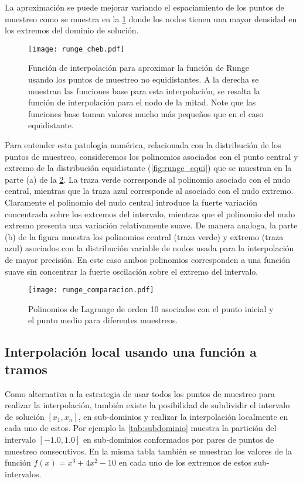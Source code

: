 La aproximación se puede mejorar variando el espaciamiento de los puntos de muestreo como se muestra en la \cref{fig:runge_cheb} donde los nodos tienen una mayor densidad en los extremos del dominio de solución.

\begin{figure}[H]
  \centering
  \texttt{[image: runge\_cheb.pdf]}
  \caption{Función de interpolación para aproximar la función de Runge usando los puntos de muestreo no equidistantes. A la derecha se muestran las funciones base para esta interpolación, se resalta la función de interpolación para el nodo de la mitad. Note que las funciones base toman valores mucho más pequeños que en el caso equidistante.}
\label{fig:runge_cheb}
\end{figure}

Para entender esta patología numérica, relacionada con la distribución de los puntos de muestreo, consideremos los polinomios asociados con el punto central y extremo de la distribución equidistante (\cref{fig:runge_equi}) que se muestran en la parte (a) de la \cref{fig:runge_comparacion}. La traza verde corresponde al polinomio asociado con el nudo central, mientras que la traza azul corresponde al asociado con el nudo extremo. Claramente el polinomio del nudo central introduce la fuerte variación concentrada sobre los extremos del intervalo, mientras que el polinomio del nudo extremo presenta una variación relativamente suave. De manera analoga, la parte (b) de la figura muestra los polinomios central (traza verde) y extremo (traza azul) asociados con la distribución variable de nodos usada para la interpolación de mayor precisión. En este caso ambos polinomios corresponden a una función suave sin concentrar la fuerte oscilación sobre el extremo del intervalo.

\begin{figure}[H]
  \centering
  \texttt{[image: runge\_comparacion.pdf]}
  \caption{Polinomios de Lagrange de orden 10 asociados con el punto inicial y el punto medio para diferentes muestreos.}
  \label{fig:runge_comparacion}
\end{figure}


\subsection{Interpolación local usando una función a tramos}
Como alternativa a la estrategia de usar todos los puntos de muestreo  para realizar la interpolación, también existe la posibilidad de subdividir el intervalo de solución $[x_1, x_n]$, en sub-dominios y realizar la interpolación localmente en cada uno de estos. Por ejemplo la \cref{tab:subdominio} muestra la partición del intervalo $[-1.0, 1.0]$ en sub-dominios conformados por pares de puntos de muestreo consecutivos. En la misma tabla también se muestran los valores de la función $f(x) = {x^3} + 4{x^2} - 10$ en cada uno de los extremos de estos sub-intervalos.

